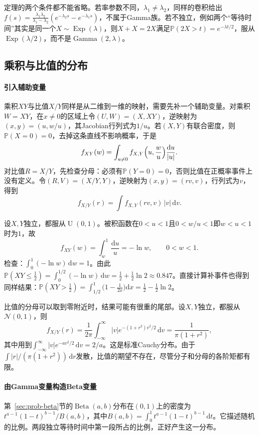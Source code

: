 定理的两个条件都不能省略。若率参数不同，$\lambda_1\neq\lambda_2$，同样的卷积给出$f(s)=\frac{\lambda_1\lambda_2}{\lambda_1-\lambda_2}(e^{-\lambda_2s}-e^{-\lambda_1s})$，不属于Gamma族。若不独立，例如两个“等待时间”其实是同一个$X\sim\operatorname{Exp}(\lambda)$，则$X+X=2X$满足$\mathbb P(2X>t)=e^{-\lambda t/2}$，服从$\operatorname{Exp}(\lambda/2)$，而不是$\operatorname{Gamma}(2,\lambda)$。

\subsection{乘积与比值的分布}

\paragraph{引入辅助变量}
乘积$XY$与比值$X/Y$同样是从二维到一维的映射，需要先补一个辅助变量。对乘积$W=XY$，在$x\neq0$的区域上令$(U,W)=(X,XY)$，逆映射为$(x,y)=(u,w/u)$，其Jacobian行列式为$1/u$。若$(X,Y)$有联合密度，则$\mathbb P(X=0)=0$，去掉这条直线不影响概率，于是
\[
 f_{XY}(w)=\int_{u\neq0}f_{X,Y}\Bigl(u,\frac wu\Bigr)\frac{\mathrm du}{|u|} .
\]
对比值$R=X/Y$，先检查分母：必须有$\mathbb P(Y=0)=0$，否则比值在正概率事件上没有定义。令$(R,V)=(X/Y,Y)$，逆映射为$(x,y)=(rv,v)$，行列式为$v$，得到
\[
 f_{X/Y}(r)=\int f_{X,Y}(rv,v)\,|v|\,\mathrm dv .
\]

\begin{example}[两个均匀变量的乘积]
\label{ex:rvec-uniform-product}
设$X,Y$独立，都服从$\operatorname{U}(0,1)$。被积函数在$0<u<1$且$0<w/u<1$即$w<u<1$时为$1$，故
\[
 f_{XY}(w)=\int_w^1\frac{\mathrm du}u=-\ln w,\qquad 0<w<1 .
\]
检查：$\int_0^1(-\ln w)\,\mathrm dw=1$。由此$\mathbb P(XY\le\frac12)=\int_0^{1/2}(-\ln w)\,\mathrm dw=\frac12+\frac12\ln2\approx0.847$。直接计算补事件也得到同样结果：$\mathbb P(XY>\frac12)=\int_{1/2}^1\bigl(1-\frac1{2x}\bigr)\mathrm dx=\frac12-\frac12\ln2$。
\end{example}

比值的分母可以取到零附近时，结果可能有很重的尾部。设$X,Y$独立，都服从$\mathcal N(0,1)$，则
\[
 f_{X/Y}(r)=\frac1{2\pi}\int_{-\infty}^{\infty}|v|e^{-(1+r^2)v^2/2}\,\mathrm dv=\frac1{\pi(1+r^2)} ,
\]
其中用到$\int_{-\infty}^\infty|v|e^{-av^2/2}\,\mathrm dv=2/a$。这是标准Cauchy分布。由于$\int|r|/(\pi(1+r^2))\,\mathrm dr$发散，比值的期望不存在，尽管分子和分母的各阶矩都有限。

\paragraph{由Gamma变量构造Beta变量}
第~\ref{sec:prob-beta}节的$\operatorname{Beta}(a,b)$分布在$(0,1)$上的密度为$t^{a-1}(1-t)^{b-1}/B(a,b)$，其中$B(a,b)=\int_0^1t^{a-1}(1-t)^{b-1}\,\mathrm dt$。它描述随机的比例。两段独立等待时间中第一段所占的比例，正好产生这一分布。

